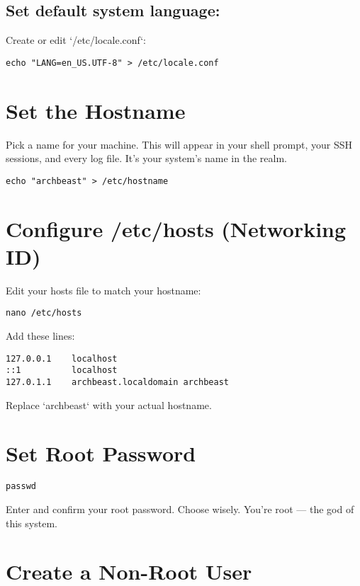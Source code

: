 \documentclass[12pt,openany]{book}
\begin{document}
\subsection*{Set default system language:}

Create or edit `/etc/locale.conf`:

\begin{lstlisting}
echo "LANG=en_US.UTF-8" > /etc/locale.conf
\end{lstlisting}

\section{Set the Hostname}

Pick a name for your machine. This will appear in your shell prompt, your SSH sessions, and every log file. It’s your system’s name in the realm.

\begin{lstlisting}
echo "archbeast" > /etc/hostname
\end{lstlisting}

\section{Configure /etc/hosts (Networking ID)}

Edit your hosts file to match your hostname:

\begin{lstlisting}
nano /etc/hosts
\end{lstlisting}

Add these lines:

\begin{lstlisting}
127.0.0.1    localhost
::1          localhost
127.0.1.1    archbeast.localdomain archbeast
\end{lstlisting}

Replace `archbeast` with your actual hostname.

\section{Set Root Password}

\begin{lstlisting}
passwd
\end{lstlisting}

Enter and confirm your root password. Choose wisely. You’re root — the god of this system.

\section{Create a Non-Root User}
\end{document}
